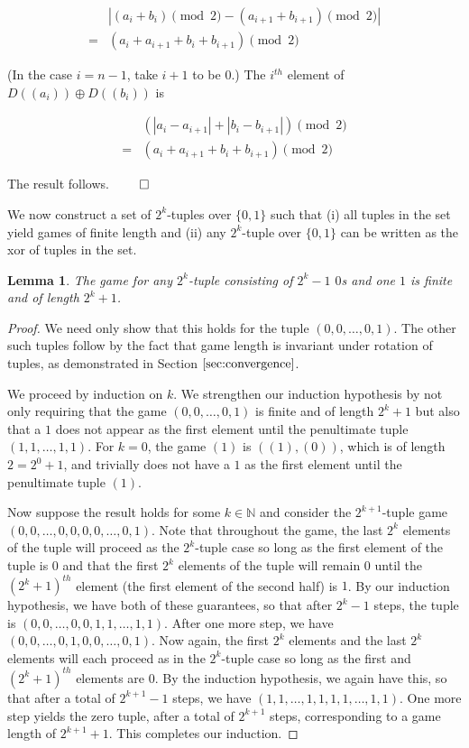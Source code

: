 \documentclass[12pt]{amsart}
\newtheorem{lemma}[theorem]{Lemma}
\newcommand{\xor}{\oplus}
\newcommand{\znn}{\mathbb{N}}
\begin{document}
$$\begin{array}{cl}
& |(a_i+b_i)\pmod{2} - (a_{i+1}+b_{i+1})\pmod{2}| \\
= & (a_i+a_{i+1}+b_i+b_{i+1})\pmod{2}
\end{array}$$

(In the case $i=n-1$, take $i+1$ to be $0$.) The $i^{th}$ element of $D((a_i))\xor D((b_i))$ is

$$\begin{array}{cl}
& (|a_i-a_{i+1}|+|b_i-b_{i+1}|)\pmod{2} \\
= & (a_i+a_{i+1}+b_i+b_{i+1})\pmod{2}
\end{array}$$

The result follows. $\qed$

We now construct a set of $2^k$-tuples over $\{0,1\}$ such that (i) all tuples in the set yield games of finite length and (ii) any $2^k$-tuple over $\{0,1\}$ can be written as the xor of tuples in the set.

\begin{lemma}
The game for any $2^k$-tuple consisting of $2^k-1$ $0$s and one $1$ is finite and of length $2^k+1$.
\end{lemma}

\begin{proof}
We need only show that this holds for the tuple $(0,0,\ldots,0,1)$. The other such tuples follow by the fact that game length is invariant under rotation of tuples, as demonstrated in Section $\ref{sec:convergence}$.

We proceed by induction on $k$. We strengthen our induction hypothesis by not only requiring that the game $(0,0,\ldots,0,1)$ is finite and of length $2^k+1$ but also that a $1$ does not appear as the first element until the penultimate tuple $(1,1,\ldots,1,1)$. For $k=0$, the game $(1)$ is $((1),(0))$, which is of length $2=2^0+1$, and trivially does not have a $1$ as the first element until the penultimate tuple $(1)$.

Now suppose the result holds for some $k\in \znn$ and consider the $2^{k+1}$-tuple game $(0,0,\ldots,0,0,0,0,\ldots,0,1)$. Note that throughout the game, the last $2^k$ elements of the tuple will proceed as the $2^k$-tuple case so long as the first element of the tuple is $0$ and that the first $2^k$ elements of the tuple will remain $0$ until the $(2^k+1)^{th}$ element (the first element of the second half) is $1$. By our induction hypothesis, we have both of these guarantees, so that after $2^k-1$ steps, the tuple is $(0,0,\ldots,0,0,1,1,\ldots,1,1)$. After one more step, we have $(0,0,\ldots,0,1,0,0,\ldots,0,1)$. Now again, the first $2^k$ elements and the last $2^k$ elements will each proceed as in the $2^k$-tuple case so long as the first and $(2^k+1)^{th}$ elements are $0$. By the induction hypothesis, we again have this, so that after a total of $2^{k+1}-1$ steps, we have $(1,1,\ldots,1,1,1,1,\ldots,1,1)$. One more step yields the zero tuple, after a total of $2^{k+1}$ steps, corresponding to a game length of $2^{k+1}+1$. This completes our induction.
\end{proof}
\end{document}
